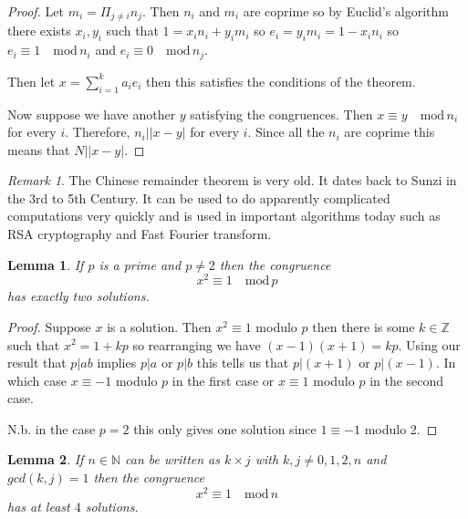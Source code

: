 \documentclass[
]{book}
\newtheorem{lemma}{Lemma}[chapter]
\theoremstyle{definition}
\theoremstyle{definition}
\theoremstyle{definition}
\theoremstyle{definition}
\theoremstyle{remark}
\newtheorem*{remark}{Remark}
\begin{document}
\begin{proof}
Let \(m_i = \Pi_{j \neq i} n_j\). Then \(n_i\) and \(m_i\) are coprime so by Euclid's algorithm there exists \(x_i,y_i\) such that \(1 = x_i n_i + y_i m_i\) so \(e_i =y_i m_i = 1- x_i n_i\) so \(e_i \equiv 1 \quad \mbox{mod} \, n_i\) and \(e_i \equiv 0 \quad \mbox{mod} \, n_j\).

Then let \(x = \sum_{i=1}^k a_i e_i\) then this satisfies the conditions of the theorem.

Now suppose we have another \(y\) satisfying the congruences. Then \(x \equiv y \quad \mbox{mod} \, n_i\) for every \(i\). Therefore, \(n_i| |x-y|\) for every \(i\). Since all the \(n_i\) are coprime this means that \(N | |x-y|\).
\end{proof}

\begin{remark}
The Chinese remainder theorem is very old. It dates back to Sunzi in the 3rd to 5th Century. It can be used to do apparently complicated computations very quickly and is used in important algorithms today such as RSA cryptography and Fast Fourier transform.
\end{remark}

\begin{lemma}
If \(p\) is a prime and \(p \neq 2\) then the congruence
\[ x^2 \equiv 1 \quad \mbox{mod} \,p  \]
has exactly two solutions.
\end{lemma}

\begin{proof}
Suppose \(x\) is a solution. Then \(x^2 \equiv 1\) modulo \(p\) then there is some \(k \in \mathbb{Z}\) such that \(x^2 = 1+kp\) so rearranging we have \((x-1)(x+1) = kp\). Using our result that \(p|ab\) implies \(p|a\) or \(p|b\) this tells us that \(p|(x+1)\) or \(p|(x-1)\). In which case \(x \equiv -1\) modulo \(p\) in the first case or \(x \equiv 1\) modulo \(p\) in the second case.

N.b. in the case \(p=2\) this only gives one solution since \(1\equiv -1\) modulo 2.
\end{proof}

\begin{lemma}
If \(n \in \mathbb{N}\) can be written as \(k\times j\) with \(k,j \neq 0,1,2, n\) and \(gcd(k,j)=1\) then the congruence
\[ x^2 \equiv 1 \quad \mbox{mod} \, n  \]
has at least \(4\) solutions.
\end{lemma}
\end{document}
